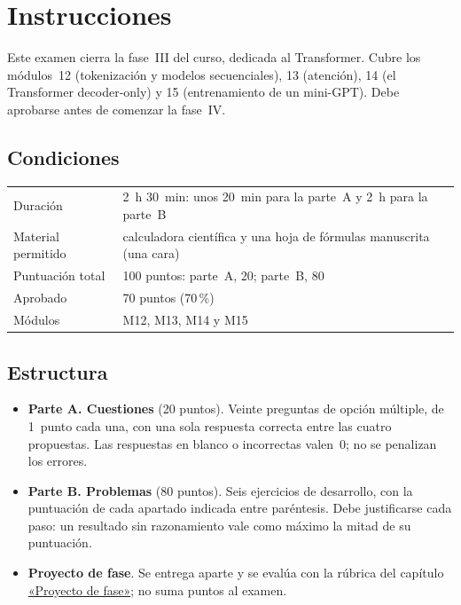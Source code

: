 \chapter*{Instrucciones}

Este examen cierra la fase~III del curso, dedicada al Transformer. Cubre los módulos~12 (tokenización y modelos secuenciales), 13 (atención), 14 (el Transformer decoder-only) y 15 (entrenamiento de un mini-GPT). Debe aprobarse antes de comenzar la fase~IV.

\section*{Condiciones}
\begin{center}
\begin{tabular}{@{}ll@{}}
\toprule
Duración & 2~h 30~min: unos 20~min para la parte~A y 2~h para la parte~B \\
Material permitido & calculadora científica y una hoja de fórmulas manuscrita (una cara) \\
Puntuación total & 100 puntos: parte~A, 20; parte~B, 80 \\
Aprobado & 70 puntos (70\,\%) \\
Módulos & M12, M13, M14 y M15 \\
\bottomrule
\end{tabular}
\end{center}

\section*{Estructura}
\begin{itemize}[leftmargin=1.4em,label=\textendash]
  \item \textbf{Parte A. Cuestiones} (20 puntos). Veinte preguntas de opción múltiple, de 1~punto cada una, con una sola respuesta correcta entre las cuatro propuestas. Las respuestas en blanco o incorrectas valen~0; no se penalizan los errores.
  \item \textbf{Parte B. Problemas} (80 puntos). Seis ejercicios de desarrollo, con la puntuación de cada apartado indicada entre paréntesis. Debe justificarse cada paso: un resultado sin razonamiento vale como máximo la mitad de su puntuación.
  \item \textbf{Proyecto de fase}. Se entrega aparte y se evalúa con la rúbrica del capítulo \hyperref[chap:proyecto]{«Proyecto de fase»}; no suma puntos al examen.
\end{itemize}


